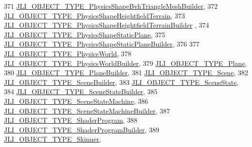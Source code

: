 \begin{DoxyCode}
371     \mbox{\hyperlink{namespacenjli_a6d56d4fbaf89fcf3e3d32839df05b444a9566922f6aed87f8897da75430f07460}{JLI\_OBJECT\_TYPE\_PhysicsShapeBvhTriangleMeshBuilder}},
372     \mbox{\hyperlink{namespacenjli_a6d56d4fbaf89fcf3e3d32839df05b444aa4746c51c849b53ec9dcbe461b76e138}{JLI\_OBJECT\_TYPE\_PhysicsShapeHeightfieldTerrain}},
373     \mbox{\hyperlink{namespacenjli_a6d56d4fbaf89fcf3e3d32839df05b444a49bbc14897f0615b33c0ce6cbc864dbb}{JLI\_OBJECT\_TYPE\_PhysicsShapeHeightfieldTerrainBuilder}}
      ,
374     \mbox{\hyperlink{namespacenjli_a6d56d4fbaf89fcf3e3d32839df05b444a69bd909ded4e0e4171d034ddebe0cf09}{JLI\_OBJECT\_TYPE\_PhysicsShapeStaticPlane}},
375     \mbox{\hyperlink{namespacenjli_a6d56d4fbaf89fcf3e3d32839df05b444a4c7f5cc3ead65995d70da08aab7e9029}{JLI\_OBJECT\_TYPE\_PhysicsShapeStaticPlaneBuilder}},
376 
377     \mbox{\hyperlink{namespacenjli_a6d56d4fbaf89fcf3e3d32839df05b444aa2a35b548ed9b3b2dff2f5ab33f949ef}{JLI\_OBJECT\_TYPE\_PhysicsWorld}},
378     \mbox{\hyperlink{namespacenjli_a6d56d4fbaf89fcf3e3d32839df05b444aa0a216e28a5de7dabccee732eccb99d4}{JLI\_OBJECT\_TYPE\_PhysicsWorldBuilder}},
379     \mbox{\hyperlink{namespacenjli_a6d56d4fbaf89fcf3e3d32839df05b444a73b5b10a77c6e746f173f03b66c05452}{JLI\_OBJECT\_TYPE\_Plane}},
380     \mbox{\hyperlink{namespacenjli_a6d56d4fbaf89fcf3e3d32839df05b444a965748a48832125428d946a1b0201bde}{JLI\_OBJECT\_TYPE\_PlaneBuilder}},
381     \mbox{\hyperlink{namespacenjli_a6d56d4fbaf89fcf3e3d32839df05b444a6dc36dba9d483c432ccbc88d5b7ee7fd}{JLI\_OBJECT\_TYPE\_Scene}},
382     \mbox{\hyperlink{namespacenjli_a6d56d4fbaf89fcf3e3d32839df05b444afb5f240d9d7c0767765244294dac3962}{JLI\_OBJECT\_TYPE\_SceneBuilder}},
383     \mbox{\hyperlink{namespacenjli_a6d56d4fbaf89fcf3e3d32839df05b444a32e34fa3e3639cdda2e64680d5def9df}{JLI\_OBJECT\_TYPE\_SceneState}},
384     \mbox{\hyperlink{namespacenjli_a6d56d4fbaf89fcf3e3d32839df05b444a648a878cfdc412de15bcd0116921ed0c}{JLI\_OBJECT\_TYPE\_SceneStateBuilder}},
385     \mbox{\hyperlink{namespacenjli_a6d56d4fbaf89fcf3e3d32839df05b444a9d8eeb6715ea8e032f567fff981b3021}{JLI\_OBJECT\_TYPE\_SceneStateMachine}},
386     \mbox{\hyperlink{namespacenjli_a6d56d4fbaf89fcf3e3d32839df05b444a780d05309d85588de675847a1a8818c5}{JLI\_OBJECT\_TYPE\_SceneStateMachineBuilder}},
387     \mbox{\hyperlink{namespacenjli_a6d56d4fbaf89fcf3e3d32839df05b444afc5c1e38c907b27cd79b8a154aa1f021}{JLI\_OBJECT\_TYPE\_ShaderProgram}},
388     \mbox{\hyperlink{namespacenjli_a6d56d4fbaf89fcf3e3d32839df05b444a4cddb91744b04635478da2fc4e8f5059}{JLI\_OBJECT\_TYPE\_ShaderProgramBuilder}},
389     \mbox{\hyperlink{namespacenjli_a6d56d4fbaf89fcf3e3d32839df05b444aa836a2cbedd8f5fbcb94cda58d4472d8}{JLI\_OBJECT\_TYPE\_Skinner}},

\end{DoxyCode}
